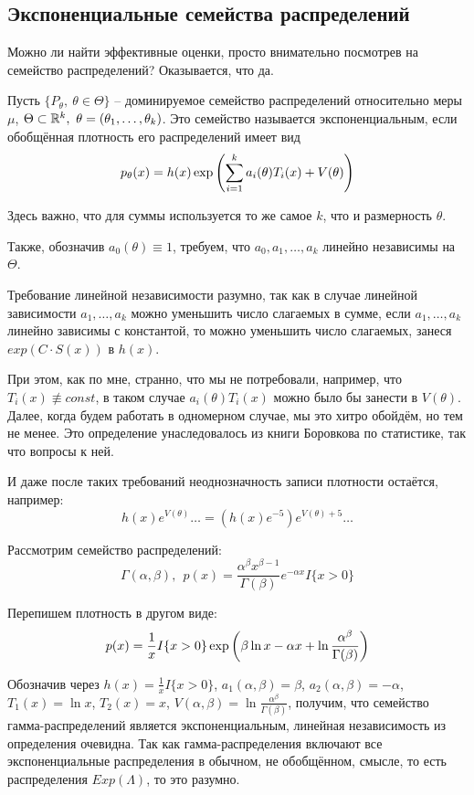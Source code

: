 \subsection{Экспоненциальные семейства распределений}

\begin{note}
    Можно ли найти эффективные оценки, просто внимательно посмотрев на семейство распределений? Оказывается, что да.
\end{note}

\begin{definition}
    Пусть $\{P_\theta,\ \theta \in \Theta\}$ -- доминируемое семейство распределений относительно меры $\mu$, $\Theta \subset \mathbb{R}^k,\ \theta = (\theta_1, \dots, \theta_k)$. Это семейство называется экспоненциальным, если обобщённая плотность его распределений имеет вид
    \[
        p_\theta(x) = h(x) \exp \left(\sum_{i=1}^k a_i(\theta) T_i(x) + V(\theta)\right)
    \]

    Здесь важно, что для суммы используется то же самое $k$, что и размерность $\theta$.
    
    Также, обозначив $a_0(\theta) \equiv 1$, требуем, что $a_0, a_1, \dots, a_k$ линейно независимы на $\Theta$.
\end{definition}

\begin{note}
    Требование линейной независимости разумно, так как в случае линейной зависимости $a_1, \dots, a_k$ можно уменьшить число слагаемых в сумме, если $a_1, \dots, a_k$ линейно зависимы с константой, то можно уменьшить число слагаемых, занеся $exp(C \cdot S(x))$ в $h(x)$.

    При этом, как по мне, странно, что мы не потребовали, например, что $T_i(x) \not\equiv const$, в таком случае $a_i(\theta) T_i(x)$ можно было бы занести в $V(\theta)$. Далее, когда будем работать в одномерном случае, мы это хитро обойдём, но тем не менее. Это определение унаследовалось из книги Боровкова по статистике, так что вопросы к ней.

    И даже после таких требований неоднозначность записи плотности остаётся, например:
    \[
        h(x) e^{V(\theta)} \dots = (h(x) e^{-5}) e^{V(\theta)+5} \dots
    \]
\end{note}

\begin{example}
    Рассмотрим семейство распределений:
    \[
        \Gamma(\alpha, \beta),\ \ p(x) = \frac{\alpha^\beta x^{\beta-1}}{\Gamma(\beta)} e^{-\alpha x} I\{x > 0\}
    \]

    Перепишем плотность в другом виде:
    \[
        p(x) = \frac{1}{x} I\{x > 0\} \exp \left(\beta \ln x - \alpha x + \ln \frac{\alpha^\beta}{\Gamma(\beta)}\right)
    \]

    Обозначив через $h(x) = \frac{1}{x} I\{x > 0\}$, $a_1(\alpha, \beta) = \beta$, $a_2(\alpha, \beta) = -\alpha$, $T_1(x) = \ln x$, $T_2(x) = x$, $V(\alpha, \beta) = \ln \frac{\alpha^\beta}{\Gamma(\beta)}$, получим, что семейство гамма-распределений является экспоненциальным, линейная независимость из определения очевидна. Так как гамма-распределения включают все экспоненциальные распределения в обычном, не обобщённом, смысле, то есть распределения $Exp(\Lambda)$, то это разумно.
\end{example}

